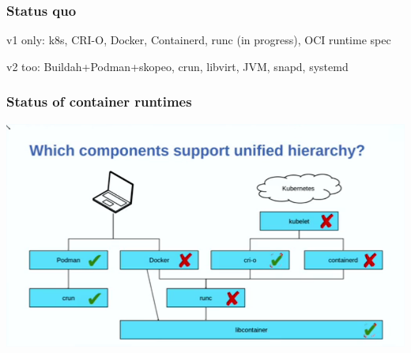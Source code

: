 \documentclass[serif]{beamer}
\begin{document}
\begin{frame}


\end{frame}


\begin{frame}
  \frametitle{Status quo}

  v1 only: k8s, CRI-O, Docker, Containerd, runc (in progress), OCI runtime spec

  \medskip

  v2 too: Buildah+Podman+skopeo, crun, libvirt, JVM, snapd, systemd
\end{frame}



\begin{frame}
  \frametitle{Status of container runtimes}

  \includegraphics[width=\textwidth]{images/container-runtime-status.png}
\end{frame}


\end{document}
